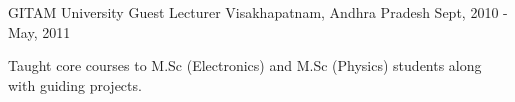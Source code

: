 \begin{cventries}
  \cventry
    {GITAM University} %
    {Guest Lecturer} %
    {Visakhapatnam, Andhra Pradesh} %
    {Sept, 2010 - May, 2011} %
    {
      \begin{cvitems} %
        \item {Taught core courses to M.Sc (Electronics) and M.Sc (Physics) students along with guiding projects.}
      \end{cvitems}
    }
%
\end{cventries}
